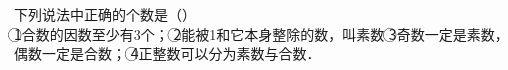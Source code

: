 
下列说法中正确的个数是（\hspace{4em}）\\
\textcircled{1}合数的因数至少有3个；
\textcircled{2}能被1和它本身整除的数，叫素数
\textcircled{3}奇数一定是素数，偶数一定是合数；
\textcircled{4}正整数可以分为素数与合数． 

